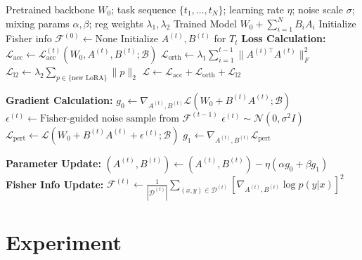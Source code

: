 \documentclass[letterpaper]{article} %
\begin{document}
\begin{algorithm}[thpb]
\caption{Multi-LoRA Training with Task-Aware Perturbation and Orthogonalization}
\label{alg:multi_lora_orth_rwp}
\begin{algorithmic}[1]
\REQUIRE Pretrained backbone $W_0$; task sequence $\{t_1, \dots, t_N\}$; learning rate $\eta$; noise scale $\sigma$; mixing params $\alpha,\beta$; reg weights $\lambda_1,\lambda_2$
\ENSURE Trained Model $W_0+\sum_{i=1}^NB_iA_i$
\STATE Initialize Fisher info $\mathcal{F}^{(0)} \gets \text{None}$
    \STATE Initialize $A^{(t)}, B^{(t)}$ for $T_t$
        \STATE \textbf{Loss Calculation:}
        \STATE $\mathcal{L}_{\text{acc}} \gets \mathcal{L}_{\text{acc}}^{(t)}(W_0, A^{(t)}, B^{(t)}; \mathcal{B})$
        \STATE $\mathcal{L}_{\text{orth}} \gets \lambda_1 \sum_{i=1}^{t-1} \|A^{(i)\top} A^{(t)}\|_F^2$
        \STATE $\mathcal{L}_{\text{l2}} \gets \lambda_2 \sum_{p \in \{\text{new LoRA}\}} \|p\|_2$
        \STATE $\mathcal{L} \gets \mathcal{L}_{\text{acc}} + \mathcal{L}_{\text{orth}} + \mathcal{L}_{\text{l2}}$
        
        \STATE \textbf{Gradient Calculation:}
        \STATE $g_0 \gets \nabla_{A^{(t)}, B^{(t)}} \mathcal{L}(W_0 + B^{(t)}A^{(t)}; \mathcal{B})$
            \STATE $\epsilon^{(t)} \gets \text{Fisher-guided noise sample from } \mathcal{F}^{(t-1)}$
        \ELSE
            \STATE $\epsilon^{(t)} \sim \mathcal{N}(0, \sigma^2 I)$
        \ENDIF
        \STATE $\mathcal{L}_{\text{pert}} \gets \mathcal{L}(W_0 + B^{(t)}A^{(t)} + \epsilon^{(t)}; \mathcal{B})$
        \STATE $g_1 \gets \nabla_{A^{(t)}, B^{(t)}} \mathcal{L}_{\text{pert}}$
        
        \STATE \textbf{Parameter Update:}
        \STATE $(A^{(t)}, B^{(t)}) \gets (A^{(t)}, B^{(t)}) - \eta (\alpha g_0 + \beta g_1)$
    \ENDFOR
    \STATE \textbf{Fisher Info Update:}
    \STATE $\mathcal{F}^{(t)} \gets \frac{1}{|\mathcal{D}^{(t)}|} \sum_{(x,y) \in \mathcal{D}^{(t)}} \left[\nabla_{A^{(t)}, B^{(t)}} \log p(y|x)\right]^2$
\ENDFOR
\end{algorithmic}
\end{algorithm}






\section{Experiment}
\end{document}
